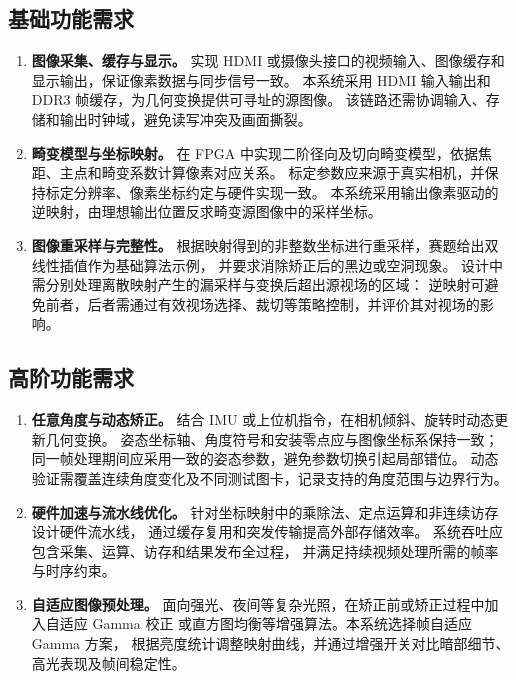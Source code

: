 \subsection{基础功能需求}
\begin{enumerate}[label=（\arabic*）]
  \item \textbf{图像采集、缓存与显示。}
  实现 HDMI 或摄像头接口的视频输入、图像缓存和显示输出，保证像素数据与同步信号一致。
  本系统采用 HDMI 输入输出和 DDR3 帧缓存，为几何变换提供可寻址的源图像。
  该链路还需协调输入、存储和输出时钟域，避免读写冲突及画面撕裂。

  \item \textbf{畸变模型与坐标映射。}
  在 FPGA 中实现二阶径向及切向畸变模型，依据焦距、主点和畸变系数计算像素对应关系。
  标定参数应来源于真实相机，并保持标定分辨率、像素坐标约定与硬件实现一致。
  本系统采用输出像素驱动的逆映射，由理想输出位置反求畸变源图像中的采样坐标。

  \item \textbf{图像重采样与完整性。}
  根据映射得到的非整数坐标进行重采样，赛题给出双线性插值作为基础算法示例，
  并要求消除矫正后的黑边或空洞现象。
  设计中需分别处理离散映射产生的漏采样与变换后超出源视场的区域：
  逆映射可避免前者，后者需通过有效视场选择、裁切等策略控制，并评价其对视场的影响。
\end{enumerate}

\subsection{高阶功能需求}
\begin{enumerate}[label=（\arabic*）]
  \item \textbf{任意角度与动态矫正。}
  结合 IMU 或上位机指令，在相机倾斜、旋转时动态更新几何变换。
  姿态坐标轴、角度符号和安装零点应与图像坐标系保持一致；
  同一帧处理期间应采用一致的姿态参数，避免参数切换引起局部错位。
  动态验证需覆盖连续角度变化及不同测试图卡，记录支持的角度范围与边界行为。

  \item \textbf{硬件加速与流水线优化。}
  针对坐标映射中的乘除法、定点运算和非连续访存设计硬件流水线，
  通过缓存复用和突发传输提高外部存储效率。
  系统吞吐应包含采集、运算、访存和结果发布全过程，
  并满足持续视频处理所需的帧率与时序约束。

  \item \textbf{自适应图像预处理。}
  面向强光、夜间等复杂光照，在矫正前或矫正过程中加入自适应 Gamma 校正
  或直方图均衡等增强算法。本系统选择帧自适应 Gamma 方案，
  根据亮度统计调整映射曲线，并通过增强开关对比暗部细节、高光表现及帧间稳定性。
\end{enumerate}

